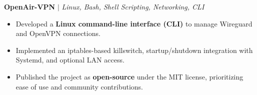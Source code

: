 \documentclass[11pt,letterpaper]{article}
\begin{document}
\begin{list}{}{\setlength{\leftmargin}{1em}\setlength{\rightmargin}{2pt}}
    \item
        \small{\textbf{OpenAir-VPN}} $|$ \small{\textit{Linux, Bash, Shell Scripting, Networking, CLI}} \hfill \small{\textit{}}
          \begin{itemize}[itemsep=-5pt, topsep=-2pt]
              \item Developed a \textbf{Linux command-line interface (CLI)} to manage Wireguard and OpenVPN connections.
              \item Implemented an iptables-based killswitch, startup/shutdown integration with Systemd, and optional LAN access.
              \item Published the project as \textbf{open-source} under the MIT license, prioritizing ease of use and community contributions.
          \end{itemize}
          \vspace{4pt}
    
\end{list}



\end{document}

